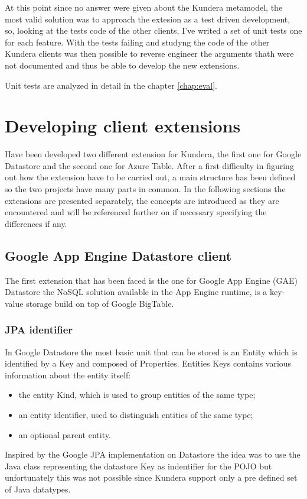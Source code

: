 \noindent At this point since no answer were given about the Kundera metamodel, the most valid solution was to approach the extesion as a test driven development, so, looking at the tests code of the other clients, I've writed a set of unit tests one for each feature.
With the tests failing and studyng the code of the other Kundera clients was then possible to reverse engineer the arguments thath were not documented and thus be able to develop the new extensions.

\newparagraph Unit tests are analyzed in detail in the chapter \ref{chap:eval}.

\section{Developing client extensions}
Have been developed two different extension for Kundera, the first one for Google Datastore and the second one for Azure Table.
After a first difficulty in figuring out how the extension have to be carried out, a main structure has been defined so the two projects have many parts in common. 
In the following sections the extensions are presented separately, the concepts are introduced as they are encountered and will be referenced further on if necessary specifying the differences if any.

\subsection{Google App Engine Datastore client}
\label{sec:kundera-datastore}
The first extension that has been faced is the one for Google App Engine (GAE) Datastore \cite{online:datastore} the NoSQL solution available in the App Engine runtime, is a key-value storage build on top of Google BigTable.

\subsubsection{JPA identifier}
In Google Datastore the most basic unit that can be stored is an Entity which is identified by a Key and composed of Properties.
Entities Keys contains various information about the entity itself:
\begin{itemize}
\item the entity Kind, which is used to group entities of the same type;
\item an entity identifier, used to distinguish entities of the same type;
\item an optional parent entity. 
\end{itemize}
Inspired by the Google JPA implementation on Datastore the idea was to use the Java class representing the datastore Key as indentifier for the POJO but unfortunately this was not possible since Kundera support only a pre defined set of Java datatypes.

